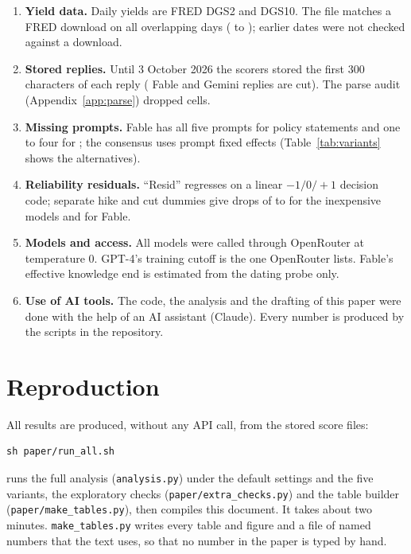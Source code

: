 \begin{enumerate}
the prompt-spread comparison of Section~\ref{sec:reliability}.
\item \textbf{Yield data.} Daily yields are FRED DGS2 and DGS10. The file matches a FRED download on all
 overlapping days ( to ); earlier dates were not checked against a
download.
\item \textbf{Stored replies.} Until 3 October 2026 the scorers stored the first 300 characters of each
reply ( Fable and  Gemini replies are cut). The parse audit
(Appendix~\ref{app:parse}) dropped  cells.
\item \textbf{Missing prompts.} Fable has all five prompts for  policy statements and
one to four for ; the consensus uses prompt fixed effects
(Table~\ref{tab:variants} shows the alternatives).
\item \textbf{Reliability residuals.} ``Resid'' regresses on a linear $-1/0/+1$ decision code; separate
hike and cut dummies give drops of  to  for the inexpensive models
and  for Fable.
\item \textbf{Models and access.} All models were called through OpenRouter at temperature 0. GPT-4's
training cutoff is the one OpenRouter lists. Fable's effective knowledge end is estimated from the dating
probe only.
\item \textbf{Use of AI tools.} The code, the analysis and the drafting of this paper were done with the
help of an AI assistant (Claude). Every number is produced by the scripts in the repository.
\end{enumerate}

\section{Reproduction}\label{app:repro}

All results are produced, without any API call, from the stored score files:
\begin{verbatim}
sh paper/run_all.sh
\end{verbatim}
runs the full analysis (\texttt{analysis.py}) under the default settings and the five variants, the
exploratory checks (\texttt{paper/extra\_checks.py}) and the table builder
(\texttt{paper/make\_tables.py}), then compiles this document. It takes about two minutes.
\texttt{make\_tables.py} writes every table and figure and a file of named numbers that the text uses, so
that no number in the paper is typed by hand.
